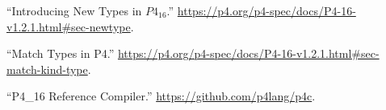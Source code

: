 \documentclass[11pt]{article}
\begin{document}
{{\begin{thebibliography}{45}
\mdbibitemlabel{{}[13]}\textquotedblleft{}Introducing New Types in $P4_{16}$.\textquotedblright{} \href{https://p4.org/p4-spec/docs/P4-16-v1.2.1.html\%23sec-newtype}{{\ttfamily https://\hspace{0pt}p4.\hspace{0pt}org/\hspace{0pt}p4-\hspace{0pt}spec/\hspace{0pt}docs/\hspace{0pt}P4-\hspace{0pt}16-\hspace{0pt}v1.\hspace{0pt}2.\hspace{0pt}1.\hspace{0pt}html\#\hspace{0pt}sec-\hspace{0pt}newtype}}.\label{p4newtypes}%

\mdbibitemlabel{{}[14]}\textquotedblleft{}Match Types in P4.\textquotedblright{} \href{https://p4.org/p4-spec/docs/P4-16-v1.2.1.html\%23sec-match-kind-type}{{\ttfamily https://\hspace{0pt}p4.\hspace{0pt}org/\hspace{0pt}p4-\hspace{0pt}spec/\hspace{0pt}docs/\hspace{0pt}P4-\hspace{0pt}16-\hspace{0pt}v1.\hspace{0pt}2.\hspace{0pt}1.\hspace{0pt}html\#\hspace{0pt}sec-\hspace{0pt}match-\hspace{0pt}kind-\hspace{0pt}type}}.\label{p4matchtypes}%

\mdbibitemlabel{{}[15]}\textquotedblleft{}P4\_16 Reference Compiler.\textquotedblright{} \href{https://github.com/p4lang/p4c}{{\ttfamily https://\hspace{0pt}github.\hspace{0pt}com/\hspace{0pt}p4lang/\hspace{0pt}p4c}}.\label{p4c}%


\end{thebibliography}}}
\end{document}
